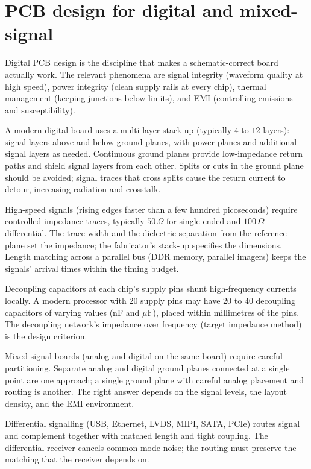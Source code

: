 \section{PCB design for digital and mixed-signal}

Digital PCB design is the discipline that makes a schematic-correct board actually work. The relevant phenomena are signal integrity (waveform quality at high speed), power integrity (clean supply rails at every chip), thermal management (keeping junctions below limits), and EMI (controlling emissions and susceptibility).

A modern digital board uses a multi-layer stack-up (typically $4$ to $12$ layers): signal layers above and below ground planes, with power planes and additional signal layers as needed. Continuous ground planes provide low-impedance return paths and shield signal layers from each other. Splits or cuts in the ground plane should be avoided; signal traces that cross splits cause the return current to detour, increasing radiation and crosstalk.

High-speed signals (rising edges faster than a few hundred picoseconds) require controlled-impedance traces, typically $50\,\Omega$ for single-ended and $100\,\Omega$ differential. The trace width and the dielectric separation from the reference plane set the impedance; the fabricator's stack-up specifies the dimensions. Length matching across a parallel bus (DDR memory, parallel imagers) keeps the signals' arrival times within the timing budget.

Decoupling capacitors at each chip's supply pins shunt high-frequency currents locally. A modern processor with $20$ supply pins may have $20$ to $40$ decoupling capacitors of varying values (nF and $\mu\text{F}$), placed within millimetres of the pins. The decoupling network's impedance over frequency (target impedance method) is the design criterion.

Mixed-signal boards (analog and digital on the same board) require careful partitioning. Separate analog and digital ground planes connected at a single point are one approach; a single ground plane with careful analog placement and routing is another. The right answer depends on the signal levels, the layout density, and the EMI environment.

Differential signalling (USB, Ethernet, LVDS, MIPI, SATA, PCIe) routes signal and complement together with matched length and tight coupling. The differential receiver cancels common-mode noise; the routing must preserve the matching that the receiver depends on.

